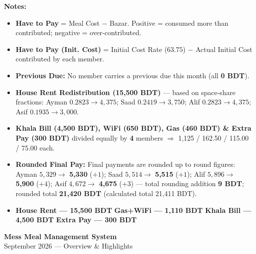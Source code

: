 \documentclass{article}
\begin{document}
\hfill
\begin{minipage}{0.46\textwidth}
\normalsize
\textbf{Notes:}
\begin{itemize}[itemsep=3pt]
    \item \textbf{Have to Pay} = Meal Cost $-$ Bazar. Positive = consumed more than contributed; negative = over-contributed.
    \item \textbf{Have to Pay (Init. Cost)} = Initial Cost Rate ($63.75$) $-$ Actual Initial Cost contributed by each member.
    \item \textbf{Previous Due:} No member carries a previous due this month (all \textbf{0 BDT}).
    \item \textbf{House Rent Redistribution (15,500 BDT)} --- based on space-share fractions: Ayman $0.2823 \rightarrow 4{,}375$; Saad $0.2419 \rightarrow 3{,}750$; Alif $0.2823 \rightarrow 4{,}375$; Asif $0.1935 \rightarrow 3{,}000$.
    \item \textbf{Khala Bill (4,500 BDT), WiFi (650 BDT), Gas (460 BDT) \& Extra Pay (300 BDT)} divided equally by \textbf{4} members $\Rightarrow$ 1,125 / 162.50 / 115.00 / 75.00 each.
    \item \textbf{Rounded Final Pay:} Final payments are rounded up to round figures: Ayman $5{,}329 \rightarrow$ \textbf{5,330} ($+1$); Saad $5{,}514 \rightarrow$ \textbf{5,515} ($+1$); Alif $5{,}896 \rightarrow$ \textbf{5,900} ($+4$); Asif $4{,}672 \rightarrow$ \textbf{4,675} ($+3$) --- total rounding addition \textbf{9 BDT}; rounded total \textbf{21,420 BDT} (calculated total 21,411 BDT).
    \item \textbf{House Rent --- 15,500 BDT} \quad \textbf{Gas+WiFi --- 1,110 BDT} \quad \textbf{Khala Bill --- 4,500 BDT} \quad \textbf{Extra Pay --- 300 BDT}
\end{itemize}
\end{minipage}

\newpage


\begin{center}
\LARGE\textbf{Mess Meal Management System}\\[4pt]
\Large September 2026 — Overview \& Highlights
\end{center}

\vspace{0.5cm}
\end{document}
